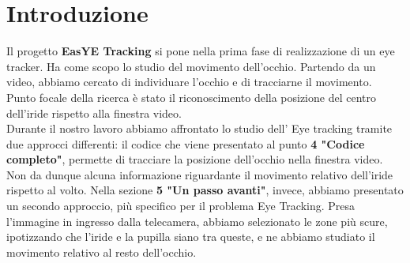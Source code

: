 \documentclass[12pt]{article}
\begin{document}
\section{Introduzione}
Il progetto \textbf{EasYE Tracking} si pone nella prima fase di realizzazione di un eye tracker. Ha come scopo lo studio del movimento dell'occhio. Partendo da un video, abbiamo cercato di individuare l'occhio e di tracciarne il movimento. Punto focale della ricerca \`e stato il riconoscimento della posizione del centro dell'iride rispetto alla finestra video. 
\\Durante il nostro lavoro abbiamo affrontato lo studio dell' Eye tracking tramite due approcci differenti: il codice che viene presentato  al punto \textbf{4 "Codice completo"}, permette di tracciare la posizione dell'occhio nella finestra video. Non da dunque alcuna informazione riguardante il movimento relativo dell'iride rispetto al volto.
Nella sezione \textbf{5 "Un passo avanti"}, invece, abbiamo presentato un secondo approccio, pi\`u specifico per il problema Eye Tracking. Presa l'immagine in ingresso dalla telecamera, abbiamo selezionato le zone pi\`u scure, ipotizzando che l'iride e la pupilla siano tra queste, e ne abbiamo studiato il movimento relativo al resto dell'occhio. 
\end{document}
